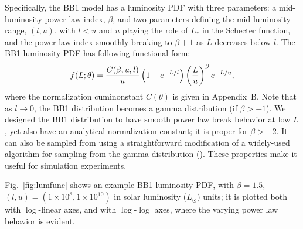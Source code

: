 Specifically, the BB1 model has a luminosity PDF with three parameters: a mid-luminosity power law index, $\beta$, and two parameters defining the mid-luminosity range, $(l, u)$, with $l < u$ and  $u$ playing the role of $L_*$ in the Schecter function, and the power law index smoothly breaking to $\beta+1$ as $L$ decreases below $l$.
The BB1 luminosity PDF has following functional form:
\begin{equation}
\label{eq:lumPDF} 
f(L ; \theta) = 
  \frac{C(\beta,u,l)}{u}\left(1-e^{-L/l}\right) \left(\frac{L}{u}\right)^{\beta} e^{-L/u},
\end{equation}
where the normalization cuminonstant $C(\theta)$ is given in Appendix~B.
Note that as $l\rightarrow 0$, the BB1 distribution becomes a gamma distribution (if $\beta > -1$).
We designed the BB1 distribution to have smooth power law break behavior at low $L$, yet also have an analytical normalization constant;
it is proper for $\beta > -2$.
It can also be sampled from using a straightforward modification of a widely-used algorithm for sampling from the gamma distribution (\citealt{ahrens_computer_1974}).
These properties make it useful for simulation experiments.


Fig.~\ref{fig:lumfunc} shows an example BB1 luminosity PDF, with $\beta = 1.5$, $(l,u) = (1\times 10^{8}, 1\times 10^{10})$ in solar luminosity ($L_\odot$) units; it is plotted both with $\log$-linear axes, and with $\log$-$\log$ axes, where the varying power law behavior is evident.


